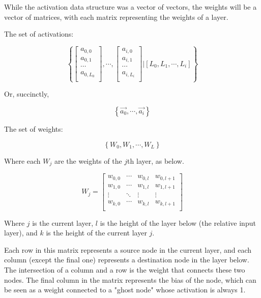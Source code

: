 \documentclass[8pt]{amsart}
\begin{document}
While the activation data structure was a vector of vectors, the weights will be
a vector of matrices, with each matrix representing the weights of a layer.

The set of activations:

\[
\left\{
    \begin{bmatrix}
        a_{0, 0} \\
        a_{0, 1} \\
        \cdots{} \\
        a_{0, L_0} \\
    \end{bmatrix},
    \cdots{},
    \begin{bmatrix}
        a_{i, 0} \\
        a_{i, 1} \\
        \cdots{} \\
        a_{i, L_i} \\
    \end{bmatrix} \vert
    \left[ L_0, L_1, \cdots{}, L_i \right]
\right\}
\]

Or, succinctly,

\[
\left\{
    \vec{a_0},
    \cdots,
    \vec{a_i}
\right\}
\]

The set of weights:

\[
\left\{
    W_0, W_1, \cdots, W_L
\right\}
\]

Where each $W_j$ are the weights of the $j$th layer, as below.

\[
    W_j =
    \begin{bmatrix}
        w_{0, 0} & \cdots & w_{0, l} & w_{0, l + 1} \\
        w_{1, 0} & \cdots & w_{1, l} & w_{1, l + 1} \\
        \vdots   & \ddots & \vdots   & \vdots       \\
        w_{k, 0} & \cdots & w_{k, l} & w_{k, l + 1} \\
    \end{bmatrix}
\]

Where $j$ is the current layer, $l$ is the height of the layer below (the relative
input layer), and $k$ is the height of the current layer $j$.

Each row in this matrix represents a source node in the current layer, and each
column (except the final one) represents a destination node in the layer below.
The intersection of a column and a row is the weight that connects these two nodes.
The final column in the matrix represents the bias of the node, which can be seen
as a weight connected to a "ghost node" whose activation is always 1.
\end{document}
